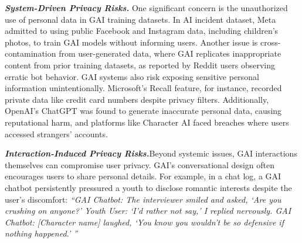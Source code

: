 \textit{\textbf{System-Driven Privacy Risks.}}
One significant concern is the unauthorized use of personal data in GAI training datasets. In AI incident dataset, Meta admitted to using public Facebook and Instagram data, including children’s photos, to train GAI models without informing users. Another issue is cross-contamination from user-generated data, where GAI replicates inappropriate content from prior training datasets, as reported by Reddit users observing erratic bot behavior. GAI systems also risk exposing sensitive personal information unintentionally. Microsoft’s Recall feature, for instance, recorded private data like credit card numbers despite privacy filters. Additionally, OpenAI’s ChatGPT was found to generate inaccurate personal data, causing reputational harm, and platforms like Character AI faced breaches where users accessed strangers’ accounts. 

\textit{\textbf{Interaction-Induced Privacy Risks.}}Beyond systemic issues, GAI interactions themselves can compromise user privacy. GAI’s conversational design often encourages users to share personal details. For example, in a chat log, a GAI chatbot persistently pressured a youth to disclose romantic interests despite the user’s discomfort: \textit{``GAI Chatbot: The interviewer smiled and asked, `Are you crushing on anyone?'
Youth User: `I’d rather not say,' I replied nervously.
GAI Chatbot: [Character name] laughed, ‘You know you wouldn’t be so defensive if nothing happened.' ''}



